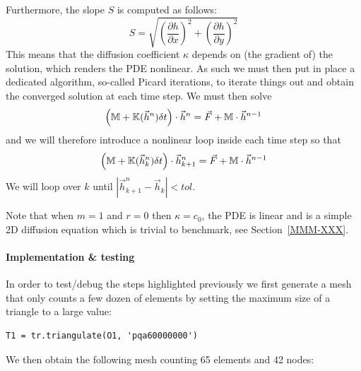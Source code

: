 Furthermore, the slope $S$ is computed as follows:
\[
S=\sqrt{ \left(\frac{\partial h}{\partial x} \right)^2 + \left(\frac{\partial h}{\partial y} \right)^2 } 
\]
This means that the diffusion coefficient $\kappa$ depends on (the gradient of) the solution,
which renders the PDE nonlinear. As such we must then put in place a dedicated algorithm, 
so-called Picard iterations, to iterate things out and obtain the converged solution at each 
time step.
We must then solve 
\[
\left({\mathbb{M}}  + {\mathbb{K}}(\vec{h}^n) \delta t \right) \cdot \vec{h}^n = \vec{F}  + {\mathbb{M}} \cdot \vec{h}^{n-1}
\]
and we will therefore introduce a nonlinear loop inside each time step so that
\[
\left({\mathbb{M}}  + {\mathbb{K}}(\vec{h}^n_k) \delta t \right) \cdot \vec{h}^n_{k+1} = \vec{F}  + {\mathbb{M}} \cdot \vec{h}^{n-1}
\]
We will loop over $k$ until $|\vec{h}_{k+1}^n-\vec{h}_k|<tol$.

Note that when $m=1$ and $r=0$ then $\kappa=c_0$, the PDE is linear and is a 
simple 2D diffusion equation which is trivial to benchmark, see Section~\ref{MMM-XXX}.






\newpage
\paragraph{Implementation \& testing}

In order to test/debug the steps highlighted previously we first generate a mesh that only
counts a few dozen of elements by setting the maximum size of a triangle to a large value:
\begin{lstlisting}
T1 = tr.triangulate(O1, 'pqa60000000')
\end{lstlisting}
We then obtain the following mesh counting 65 elements and 42 nodes:

